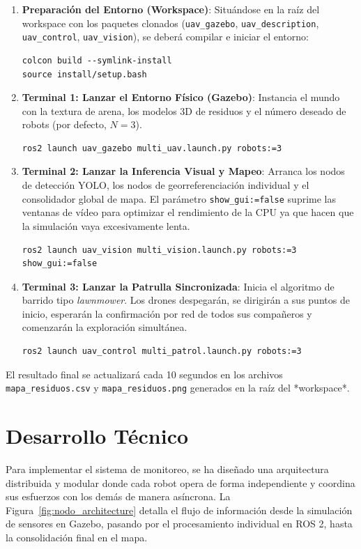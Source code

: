 \documentclass[11pt,a4paper]{article}
\begin{document}
\begin{enumerate}
    \item \textbf{Preparación del Entorno (Workspace)}: Situándose en la raíz del workspace con los paquetes clonados (\texttt{uav\_gazebo}, \texttt{uav\_description}, \texttt{uav\_control}, \texttt{uav\_vision}), se deberá compilar e iniciar el entorno:
    \begin{verbatim}
colcon build --symlink-install
source install/setup.bash
    \end{verbatim}

    \item \textbf{Terminal 1: Lanzar el Entorno Físico (Gazebo)}: Instancia el mundo con la textura de arena, los modelos 3D de residuos y el número deseado de robots (por defecto, $N=3$).
    \begin{verbatim}
ros2 launch uav_gazebo multi_uav.launch.py robots:=3
    \end{verbatim}

    \item \textbf{Terminal 2: Lanzar la Inferencia Visual y Mapeo}: Arranca los nodos de detección YOLO, los nodos de georreferenciación individual y el consolidador global de mapa. El parámetro \texttt{show\_gui:=false} suprime las ventanas de vídeo para optimizar el rendimiento de la CPU ya que hacen que la simulación vaya excesivamente lenta.
    \begin{verbatim}
ros2 launch uav_vision multi_vision.launch.py robots:=3 show_gui:=false
    \end{verbatim}

    \item \textbf{Terminal 3: Lanzar la Patrulla Sincronizada}: Inicia el algoritmo de barrido tipo \textit{lawnmower}. Los drones despegarán, se dirigirán a sus puntos de inicio, esperarán la confirmación por red de todos sus compañeros y comenzarán la exploración simultánea.
    \begin{verbatim}
ros2 launch uav_control multi_patrol.launch.py robots:=3
    \end{verbatim}
\end{enumerate}

El resultado final se actualizará cada 10 segundos en los archivos \texttt{mapa\_residuos.csv} y \texttt{mapa\_residuos.png} generados en la raíz del *workspace*.

\section{Desarrollo Técnico}
Para implementar el sistema de monitoreo, se ha diseñado una arquitectura distribuida y modular donde cada robot opera de forma independiente y coordina sus esfuerzos con los demás de manera asíncrona. La Figura~\ref{fig:nodo_architecture} detalla el flujo de información desde la simulación de sensores en Gazebo, pasando por el procesamiento individual en ROS 2, hasta la consolidación final en el mapa.
\end{document}

